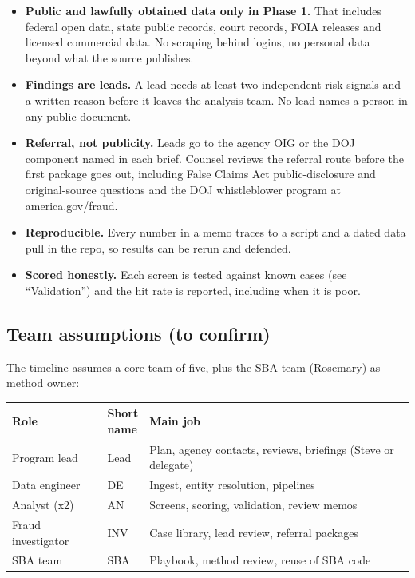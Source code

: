 \documentclass[letterpaper,11pt]{article}
\providecommand{\tightlist}{\setlength{\itemsep}{0pt}\setlength{\parskip}{0pt}}
\begin{document}
\begin{itemize}
\tightlist
\item
  \textbf{Public and lawfully obtained data only in Phase 1.} That
  includes federal open data, state public records, court records, FOIA
  releases and licensed commercial data. No scraping behind logins, no
  personal data beyond what the source publishes.
\item
  \textbf{Findings are leads.} A lead needs at least two independent
  risk signals and a written reason before it leaves the analysis team.
  No lead names a person in any public document.
\item
  \textbf{Referral, not publicity.} Leads go to the agency OIG or the
  DOJ component named in each brief. Counsel reviews the referral route
  before the first package goes out, including False Claims Act
  public-disclosure and original-source questions and the DOJ
  whistleblower program at america.gov/fraud.
\item
  \textbf{Reproducible.} Every number in a memo traces to a script and a
  dated data pull in the repo, so results can be rerun and defended.
\item
  \textbf{Scored honestly.} Each screen is tested against known cases
  (see ``Validation'') and the hit rate is reported, including when it
  is poor.
\end{itemize}

\hypertarget{team-assumptions-to-confirm}{%
\subsection{Team assumptions (to
confirm)}\label{team-assumptions-to-confirm}}

The timeline assumes a core team of five, plus the SBA team (Rosemary)
as method owner:

\begingroup\small\setlength{\tabcolsep}{4pt}\renewcommand{\arraystretch}{1.25}
\begin{longtable}[l]{@{}>{\raggedright\arraybackslash}p{}l>{\raggedright\arraybackslash}p{}@{}}
\rowcolor{coolblack}\leavevmode\color{white}\bfseries Role & \leavevmode\color{white}\bfseries \makecell[tl]{Short\\name} & \leavevmode\color{white}\bfseries Main job \\
\endhead
Program lead & Lead & Plan, agency contacts, reviews, briefings (Steve or delegate) \\
Data engineer & DE & Ingest, entity resolution, pipelines \\
Analyst (x2) & AN & Screens, scoring, validation, review memos \\
Fraud investigator & INV & Case library, lead review, referral packages \\
SBA team & SBA & Playbook, method review, reuse of SBA code \\
\end{longtable}\endgroup
\end{document}
